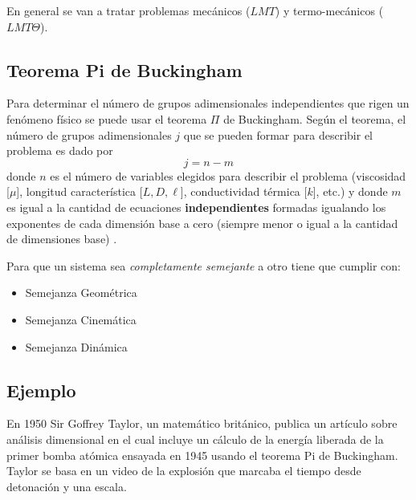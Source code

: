 En general se van a tratar problemas mecánicos ($LMT$) y termo-mecánicos ($LMT\Theta$).

\subsection{Teorema Pi de Buckingham}
 
 Para determinar el número de grupos adimensionales independientes que rigen un fenómeno físico se puede usar el teorema $\Pi$ de Buckingham. Según el teorema, el número de grupos adimensionales $j$ que se pueden formar para describir el problema es dado por
 \[
 j=n-m
 \]
 donde $n$ es el número de variables elegidos para describir el problema (viscosidad [$\mu$], longitud característica [$L,D,\ell$], conductividad térmica [$k$], etc.) y donde $m$ es igual a la cantidad de ecuaciones \textbf{independientes} formadas igualando los exponentes de cada dimensión base a cero (siempre menor o igual a la cantidad de dimensiones base) \citep{kreith2011principles}. 
 
 Para que un sistema sea \textit{completamente semejante} a otro tiene que cumplir con:
 \begin{itemize}
 	\item Semejanza Geométrica
 	\item Semejanza Cinemática
 	\item Semejanza Dinámica
 \end{itemize}
 
 \subsection{Ejemplo}
  En 1950 Sir Goffrey Taylor, un matemático británico, publica un artículo sobre análisis dimensional en el cual incluye un cálculo de la energía liberada de la primer bomba atómica ensayada en 1945 usando el teorema Pi de Buckingham. Taylor se basa en un video de la explosión que marcaba el tiempo desde detonación y una escala. 
  
